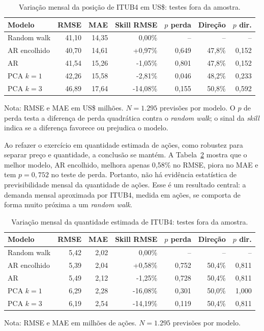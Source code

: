 \documentclass[12pt,a4paper]{report}
\begin{document}
\begin{table}[H]\centering
\caption{Variação mensal da posição de ITUB4 em US\$: testes fora da amostra.}
\label{tab:deltausd}
\scriptsize
\begin{tabular}{@{}lrrrrrr@{}}
\toprule
\textbf{Modelo} & \textbf{RMSE} & \textbf{MAE} & \textbf{Skill RMSE} &
\textbf{$p$ perda} & \textbf{Direção} & \textbf{$p$ dir.} \\
\midrule
Random walk    & 41,10 & 14,35 & 0,00\%   & --     & --     & -- \\
AR encolhido   & 40,70 & 14,61 & +0,97\%  & 0,649  & 47,8\% & 0,152 \\
AR             & 41,54 & 15,26 & -1,05\%  & 0,801  & 47,8\% & 0,152 \\
PCA $k=1$      & 42,26 & 15,58 & -2,81\%  & 0,046  & 48,2\% & 0,233 \\
PCA $k=3$      & 46,89 & 17,64 & -14,08\% & 0,155  & 50,8\% & 0,592 \\
\bottomrule
\end{tabular}
\begin{flushleft}
\scriptsize Nota: RMSE e MAE em US\$ milhões. $N=1.295$ previsões por modelo. O $p$ de perda testa a
diferença de perda quadrática contra o \emph{random walk}; o sinal da \emph{skill} indica se a diferença
favorece ou prejudica o modelo.
\end{flushleft}
\end{table}

Ao refazer o exercício em quantidade estimada de ações, como robustez para separar preço e quantidade, a
conclusão se mantém. A Tabela~\ref{tab:deltaqtd} mostra que o melhor modelo, AR encolhido, melhora apenas
0,58\% no RMSE, piora no MAE e tem $p=0{,}752$ no teste de perda. Portanto, não há evidência estatística de
previsibilidade mensal da quantidade de ações. Esse é um resultado central: a demanda mensal aproximada por
ITUB4, medida em ações, se comporta de forma muito próxima a um \emph{random walk}.

\begin{table}[H]\centering
\caption{Variação mensal da quantidade estimada de ITUB4: testes fora da amostra.}
\label{tab:deltaqtd}
\scriptsize
\begin{tabular}{@{}lrrrrrr@{}}
\toprule
\textbf{Modelo} & \textbf{RMSE} & \textbf{MAE} & \textbf{Skill RMSE} &
\textbf{$p$ perda} & \textbf{Direção} & \textbf{$p$ dir.} \\
\midrule
Random walk    & 5,42 & 2,02 & 0,00\%   & --     & --     & -- \\
AR encolhido   & 5,39 & 2,04 & +0,58\%  & 0,752  & 50,4\% & 0,811 \\
AR             & 5,49 & 2,12 & -1,25\%  & 0,728  & 50,4\% & 0,811 \\
PCA $k=1$      & 6,29 & 2,28 & -16,08\% & 0,301  & 50,0\% & 1,000 \\
PCA $k=3$      & 6,19 & 2,54 & -14,19\% & 0,119  & 50,4\% & 0,811 \\
\bottomrule
\end{tabular}
\begin{flushleft}
\scriptsize Nota: RMSE e MAE em milhões de ações. $N=1.295$ previsões por modelo.
\end{flushleft}
\end{table}
\end{document}
